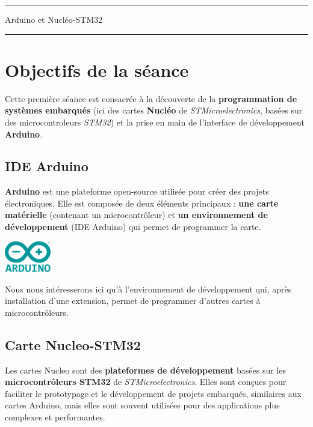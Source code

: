 \documentclass[a4paper,11pt,titlepage]{article} %
\begin{document}
\vspace{0.5cm}

\noindent \rule{\linewidth}{1pt}

{\noindent\Large \rule[-7pt]{0pt}{30pt} Arduino et Nucléo-STM32} 

\noindent \rule{\linewidth}{1pt}


\section{Objectifs de la séance}

Cette première séance est consacrée à la découverte de la \textbf{programmation de systèmes embarqués} (ici des cartes \textbf{Nucléo} de \textit{STMicroelectronics}, basées sur des microcontroleurs \textit{STM32}) et la prise en main de l'interface de développement \textbf{Arduino}.


\subsection{IDE Arduino}

\textbf{Arduino} est une plateforme open-source utilisée pour créer des projets électroniques. Elle est composée de deux éléments principaux : \textbf{une carte matérielle} (contenant un microcontrôleur) et \textbf{un environnement de développement} (IDE Arduino) qui permet de programmer la carte.

\begin{center}
	\includegraphics[width=0.15\textwidth]{images/Arduino_Logo.png}
\end{center}

Nous nous intéresserons ici qu'à l'environnement de développement qui, après installation d'une extension, permet de programmer d'autres cartes à microcontrôleurs.


\subsection{Carte Nucleo-STM32}

Les cartes Nucleo sont des \textbf{plateformes de développement} basées sur les \textbf{microcontrôleurs STM32} de \textit{STMicroelectronics}. Elles sont conçues pour faciliter le prototypage et le développement de projets embarqués, similaires aux cartes Arduino, mais elles sont souvent utilisées pour des applications plus complexes et performantes.
\end{document}

